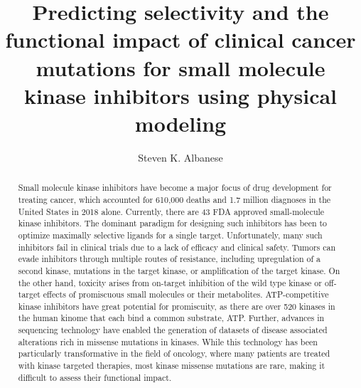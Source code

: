 \documentclass[phd,tocprelim]{cornell}
\title {Predicting selectivity and the functional impact of clinical cancer mutations for small molecule kinase inhibitors using physical modeling}
\author {Steven K. Albanese}
\begin{document}
\maketitle
\makecopyright

\begin{abstract}
Small molecule kinase inhibitors have become a major focus of drug development for treating cancer, which accounted for 610,000 deaths and 1.7 million diagnoses in the United States in 2018 alone. Currently, there are 43 FDA approved small-molecule kinase inhibitors. The dominant paradigm for designing such inhibitors has been to optimize maximally selective ligands for a single target. Unfortunately, many such inhibitors fail in clinical trials due to a lack of efficacy and clinical safety. Tumors can evade inhibitors through multiple routes of resistance, including upregulation of a second kinase, mutations in the target kinase, or amplification of the target kinase. On the other hand, toxicity arises from on-target inhibition of the wild type kinase or off-target effects of promiscuous small molecules or their metabolites. ATP-competitive kinase inhibitors have great potential for promiscuity, as there are over 520 kinases in the human kinome that each bind a common substrate, ATP.  Further, advances in sequencing technology have enabled the generation of datasets of disease associated alterations rich in missense mutations in kinases. While this technology has been particularly transformative in the field of oncology, where many patients are treated with kinase targeted therapies, most kinase missense mutations are rare, making it difficult to assess their functional impact. 

\end{abstract}
\end{document}
